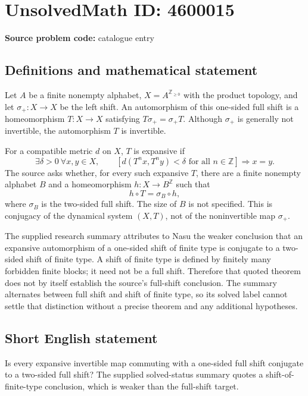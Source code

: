 \documentclass[11pt]{article}
\newcommand{\Z}{\mathbb{Z}}
\begin{document}
\section*{UnsolvedMath ID: 4600015}
\textbf{Source problem code:} catalogue entry
\subsection{Definitions and mathematical statement}
Let $A$ be a finite nonempty alphabet, $X=A^{\Z_{\geq0}}$ with the product topology, and let $\sigma_+:X\to X$ be the left shift. An automorphism of this one-sided full shift is a homeomorphism $T:X\to X$ satisfying $T\sigma_+=\sigma_+T$. Although $\sigma_+$ is generally not invertible, the automorphism $T$ is invertible.

For a compatible metric $d$ on $X$, $T$ is expansive if
\[
\exists\delta>0\ \forall x,y\in X,\qquad
\left[d(T^n x,T^n y)<\delta\text{ for all }n\in\Z\right]\Longrightarrow x=y.
\]
The source asks whether, for every such expansive $T$, there are a finite nonempty alphabet $B$ and a homeomorphism $h:X\to B^{\Z}$ such that
\[
h\circ T=\sigma_B\circ h,
\]
where $\sigma_B$ is the two-sided full shift. The size of $B$ is not specified. This is conjugacy of the dynamical system $(X,T)$, not of the noninvertible map $\sigma_+$.

The supplied research summary attributes to Nasu the weaker conclusion that an expansive automorphism of a one-sided shift of finite type is conjugate to a two-sided shift of finite type. A shift of finite type is defined by finitely many forbidden finite blocks; it need not be a full shift. Therefore that quoted theorem does not by itself establish the source's full-shift conclusion. The summary alternates between full shift and shift of finite type, so its solved label cannot settle that distinction without a precise theorem and any additional hypotheses.
\subsection{Short English statement}
Is every expansive invertible map commuting with a one-sided full shift conjugate to a two-sided full shift? The supplied solved-status summary quotes a shift-of-finite-type conclusion, which is weaker than the full-shift target.
\end{document}
